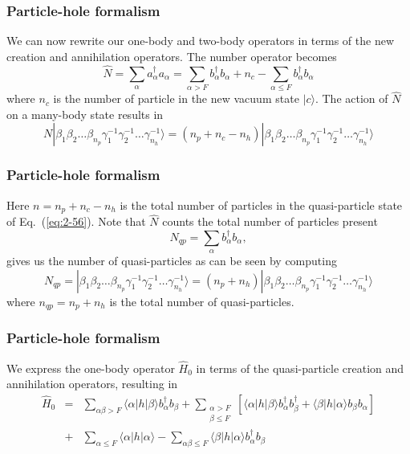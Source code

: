 \documentclass[compress]{beamer}
\newcommand*{\ket}[1]{|#1\rangle}
\newcommand*{\bra}[1]{\langle#1|}
\newcommand{\element}[3]
        {\bra{#1}#2\ket{#3}}
\begin{document}
\frame
{
  \frametitle{Particle-hole formalism}
\begin{small}
{\scriptsize
We can now rewrite our one-body and two-body operators in terms of the new creation and annihilation operators.
The number operator becomes
\begin{equation}
	\hat{N} = \sum_\alpha a_\alpha^\dagger a_\alpha= 
\sum_{\alpha > F} b_\alpha^\dagger b_\alpha + n_c - \sum_{\alpha \leq F} b_\alpha^\dagger b_\alpha \label{eq:2-57b}
\end{equation}
where $n_c$ is the number of particle in the new vacuum state $\ket{c}$.  
The action of $\hat{N}$ on a many-body state results in 
\begin{equation}
	N \ket{\beta_1\beta_2\dots \beta_{n_p} \gamma_1^{-1} \gamma_2^{-1} \dots \gamma_{n_h}^{-1}} = (n_p + n_c - n_h) 
		\ket{\beta_1\beta_2\dots \beta_{n_p} \gamma_1^{-1} \gamma_2^{-1} \dots \gamma_{n_h}^{-1}} \label{2-59}
\end{equation}
}
\end{small}
}
\frame
{
  \frametitle{Particle-hole formalism}
\begin{small}
{\scriptsize
Here  $n=n_p +n_c - n_h$ is the total number of particles in the quasi-particle state of 
Eq.~(\ref{eq:2-56}). Note that  $\hat{N}$ counts the total number of particles  present 
\begin{equation}
	N_{qp} = \sum_\alpha b_\alpha^\dagger b_\alpha, \label{eq:2-60}
\end{equation}
gives us the number of quasi-particles as can be seen by computing
\begin{equation}
	N_{qp}= \ket{\beta_1\beta_2\dots \beta_{n_p} \gamma_1^{-1} \gamma_2^{-1} \dots \gamma_{n_h}^{-1}}
		= (n_p + n_h)\ket{\beta_1\beta_2\dots \beta_{n_p} \gamma_1^{-1} \gamma_2^{-1} \dots \gamma_{n_h}^{-1}} \label{eq:2-61}
\end{equation}
where $n_{qp} = n_p + n_h$ is the total number of quasi-particles.
}
\end{small}
}
\frame
{
  \frametitle{Particle-hole formalism}
\begin{small}
{\scriptsize
We express the one-body operator $\hat{H}_0$ in terms of the quasi-particle creation and annihilation operators, resulting in
\begin{eqnarray}
	\hat{H}_0 &=& \sum_{\alpha\beta > F} \element{\alpha}{h}{\beta}  b_\alpha^\dagger b_\beta +
		\sum_{\begin{array}{c} \alpha > F \\ \beta \leq F \end{array}} \left[
		\element{\alpha}{h}{\beta} b_\alpha^\dagger b_\beta^\dagger + 
		\element{\beta}{h}{\alpha} b_\beta  b_\alpha \right] \nonumber \\
	&+& \sum_{\alpha \leq F} \element{\alpha}{h}{\alpha} - 
		\sum_{\alpha\beta \leq F} \element{\beta}{h}{\alpha}
		b_\alpha^\dagger b_\beta \label{eq:2-63b}
\end{eqnarray}
}
\end{small}
}
\end{document}
